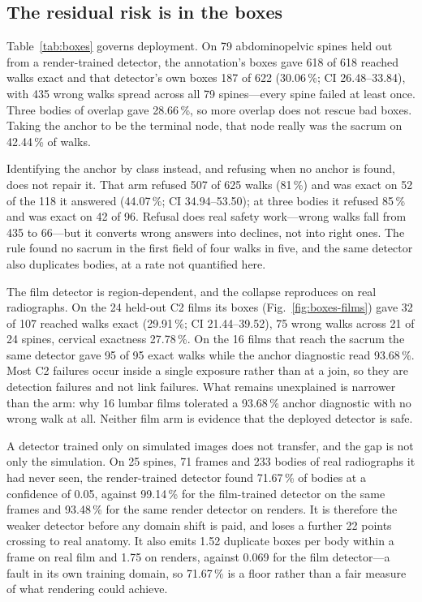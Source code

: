 \documentclass[11pt,letterpaper]{article}
\begin{document}
\subsection*{The residual risk is in the boxes}
Table~\ref{tab:boxes} governs deployment. On 79 abdominopelvic spines held out from a render-trained
detector, the annotation's boxes gave 618 of 618 reached walks exact and that detector's own boxes 187 of
622 (30.06\,\%; CI 26.48--33.84), with 435 wrong walks spread across all 79 spines---every spine failed at
least once. Three bodies of overlap gave 28.66\,\%, so more overlap does not rescue bad boxes. Taking the
anchor to be the terminal node, that node really was the sacrum on 42.44\,\% of walks.

Identifying the anchor by class instead, and refusing when no anchor is found, does not repair it. That arm
refused 507 of 625 walks (81\,\%) and was exact on 52 of the 118 it answered (44.07\,\%; CI 34.94--53.50);
at three bodies it refused 85\,\% and was exact on 42 of 96. Refusal does real safety work---wrong walks
fall from 435 to 66---but it converts wrong answers into declines, not into right ones. The rule found no
sacrum in the first field of four walks in five, and the same detector also duplicates bodies, at a rate
not quantified here.

The film detector is region-dependent, and the collapse reproduces on real radiographs. On the 24 held-out
C2 films its boxes (Fig.~\ref{fig:boxes-films}) gave 32 of 107 reached walks exact (29.91\,\%; CI 21.44--39.52), 75 wrong walks across
21 of 24 spines, cervical exactness 27.78\,\%. On the 16 films that reach the sacrum the same detector gave
95 of 95 exact walks while the anchor diagnostic read 93.68\,\%. Most C2 failures occur inside a single
exposure rather than at a join, so they are detection failures and not link failures. What remains
unexplained is narrower than the arm: why 16 lumbar films tolerated a 93.68\,\% anchor diagnostic with no
wrong walk at all. Neither film arm is evidence that the deployed detector is safe.

A detector trained only on simulated images does not transfer, and the gap is not only the
simulation. On 25 spines, 71 frames and 233 bodies of real radiographs it had never seen, the
render-trained detector found 71.67\,\% of bodies at a confidence of 0.05, against 99.14\,\% for the
film-trained detector on the same frames and 93.48\,\% for the same render detector on renders. It is
therefore the weaker detector before any domain shift is paid, and loses a further 22 points crossing to
real anatomy. It also emits 1.52 duplicate boxes per body within a frame on real film and 1.75 on
renders, against 0.069 for the film detector---a fault in its own training domain, so 71.67\,\% is a
floor rather than a fair measure of what rendering could achieve.
\end{document}
